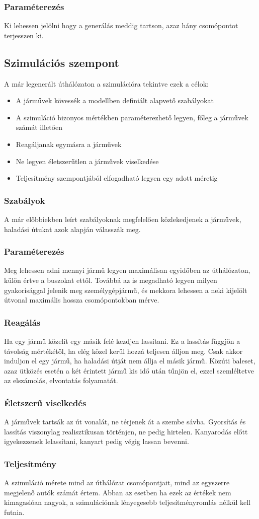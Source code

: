 \subsubsection{Paraméterezés}
Ki lehessen jelölni hogy a generálás meddig tartson, azaz hány csomópontot terjesszen ki. 
\subsection{Szimulációs szempont}
A már legenerált úthálózaton a szimulációra tekintve ezek a célok:
\begin{itemize}
\item A járművek kövessék a modellben definiált alapvető szabályokat
\item A szimuláció bizonyos mértékben paraméterezhető legyen, főleg a járművek számát illetően
\item Reagáljanak egymásra a járművek
\item Ne legyen életszerűtlen a járművek viselkedése
\item Teljesítmény szempontjából elfogadható legyen egy adott méretig
\end{itemize}
\subsubsection{Szabályok}
A már előbbiekben leírt szabályoknak megfelelően közlekedjenek a járművek, haladási útukat azok alapján válasszák meg.
\subsubsection{Paraméterezés}
Meg lehessen adni mennyi jármű legyen maximálisan egyidőben az úthálózaton, külön értve a buszokat ettől. Továbbá az is megadható legyen milyen gyakorisággal jelenik meg személygépjármű, és mekkora lehessen a neki kijelölt útvonal maximális hossza csomópontokban mérve.
\subsubsection{Reagálás}
Ha egy jármű közelít egy másik felé kezdjen lassítani. Ez a lassítás függjön a távolság mértékétől, ha elég közel kerül hozzá teljesen álljon meg. Csak akkor induljon el egy jármű, ha haladási útját nem állja el másik jármű. Közúti baleset, azaz ütközés esetén a két érintett jármű kis idő után tűnjön el, ezzel szemléltetve az elszámolás, elvontatás folyamatát.
\subsubsection{Életszerű viselkedés}
A járművek tartsák az út vonalát, ne térjenek át a szembe sávba. Gyorsítás és lassítás viszonylag realisztikusan történjen, ne pedig hirtelen. Kanyarodás előtt igyekezzenek lelassítani, kanyart pedig végig lassan bevenni.
\subsubsection{Teljesítmény}
A szimuláció mérete mind az úthálózat csomópontjait, mind az egyszerre megjelenő autók számát értem. Abban az esetben ha ezek az értékek nem kimagaslóan nagyok, a szimulációnak lényegesebb teljesítményromlás nélkül kell futnia.